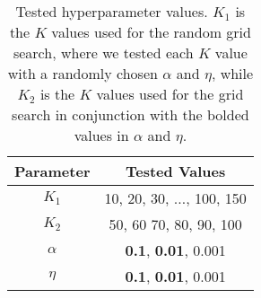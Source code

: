 \begin{table}[h]
	\centering
	\caption{Tested hyperparameter values. $K_1$ is the $K$ values used for the random grid search, where we tested each $K$ value with a randomly chosen $\alpha$ and $\eta$, while $K_2$ is the $K$ values used for the grid search in conjunction with the bolded values in $\alpha$ and $\eta$.}
	\begin{tabular}{c|c}
		Parameter & Tested Values\\
		\midrule
		$K_1$ & 10, 20, 30, $\dots$, 100, 150\\
		$K_2$ & 50, 60 70, 80, 90, 100\\
		$\alpha$ & \textbf{0.1}, \textbf{0.01}, 0.001\\
		$\eta$ & \textbf{0.1}, \textbf{0.01}, 0.001\\
	\end{tabular}
	\label{tab:gridsearch}
\end{table}
